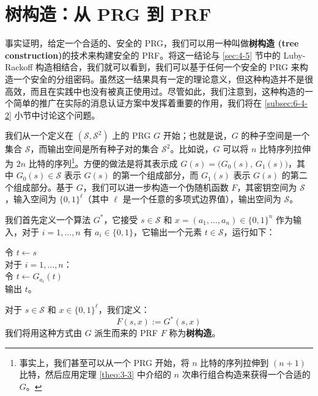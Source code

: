 \section{树构造：从 PRG 到 PRF}\label{sec:4-6}

事实证明，给定一个合适的、安全的 PRG，我们可以用一种叫做\textbf{树构造 (tree construction)}的技术来构建安全的 PRF。将这一结论与 \ref{sec:4-5} 节中的 Luby-Rackoff 构造相结合，我们就可以看到，我们可以基于任何一个安全的 PRG 来构造一个安全的分组密码。虽然这一结果具有一定的理论意义，但这种构造并不是很高效，而且在实践中也没有被真正使用过。尽管如此，我们注意到，这种构造的一个简单的推广在实际的消息认证方案中发挥着重要的作用，我们将在 \ref{subsec:6-4-2} 小节中讨论这个问题。

我们从一个定义在 $(\mathcal{S},\mathcal{S}^2)$ 上的 PRG $G$ 开始；也就是说，$G$ 的种子空间是一个集合 $\mathcal{S}$，而输出空间是所有种子对的集合 $\mathcal{S}^2$。比如说，$G$ 可以将 $n$ 比特序列拉伸为 $2n$ 比特的序列\footnote[2]{事实上，我们甚至可以从一个 PRG 开始，将 $n$ 比特的序列拉伸到 $(n+1)$ 比特，然后应用定理 \ref{theo:3-3} 中介绍的 $n$ 次串行组合构造来获得一个合适的 $G$。}。方便的做法是将其表示成 $G(s)=\big(G_0(s),\,G_1(s)\big)$，其中 $G_0(s)\in\mathcal{S}$ 表示 $G(s)$ 的第一个组成部分，而 $G_1(s)$ 表示 $G(s)$ 的第二个组成部分。基于 $G$，我们可以进一步构造一个伪随机函数 $F$，其密钥空间为 $\mathcal{S}$，输入空间为 $\{0,1\}^\ell$（其中 $\ell$ 是一个任意的多项式边界值），输出空间为 $\mathcal{S}$。

我们首先定义一个算法 $G^*$，它接受 $s\in\mathcal{S}$ 和 $x=(a_1,\dots,a_n)\in\{0,1\}^n$ 作为输入，对于 $i=1,\dots,n$ 有 $a_i\in\{0,1\}$，它输出一个元素 $t\in\mathcal{S}$，运行如下：

\vspace{10pt}

\hspace*{5pt} 令 $t\leftarrow s$\\
\hspace*{26pt} 对于 $i=1,\dots,n$：\\
\hspace*{50pt} 令 $t\leftarrow G_{a_i}(t)$\\
\hspace*{26pt} 输出 $t$。

\vspace{10pt}

\noindent
对于 $s\in\mathcal{S}$ 和 $x\in\{0,1\}^\ell$，我们定义：
\[
F(s,x):=G^*(s,x)
\]
我们将用这种方式由 $G$ 派生而来的 PRF $F$ 称为\textbf{树构造}。

